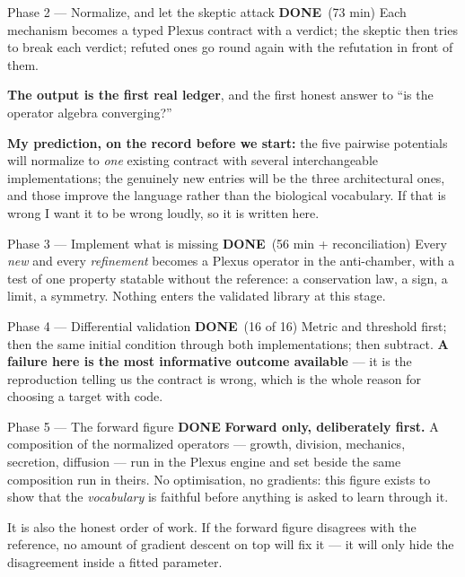 \documentclass[11pt,a4paper]{article}
\newcommand{\done}{\textcolor{good}{\textbf{DONE}}}
\begin{document}
\begin{phasebox}{Phase 2 --- Normalize, and let the skeptic attack \hfill \done\ (73 min)}
Each mechanism becomes a typed Plexus contract with a verdict; the skeptic then tries to break each
verdict; refuted ones go round again with the refutation in front of them.

\textbf{The output is the first real ledger}, and the first honest answer to ``is the operator
algebra converging?''

\textbf{My prediction, on the record before we start:} the five pairwise potentials will normalize
to \emph{one} existing contract with several interchangeable implementations; the genuinely new
entries will be the three architectural ones, and those improve the language rather than the
biological vocabulary. If that is wrong I want it to be wrong loudly, so it is written here.
\end{phasebox}

\begin{phasebox}{Phase 3 --- Implement what is missing \hfill \done\ (56 min + reconciliation)}
Every \emph{new} and every \emph{refinement} becomes a Plexus operator in the anti-chamber, with a
test of one property statable without the reference: a conservation law, a sign, a limit, a
symmetry. Nothing enters the validated library at this stage.
\end{phasebox}

\begin{phasebox}{Phase 4 --- Differential validation \hfill \done\ (16 of 16)}
Metric and threshold first; then the same initial condition through both implementations; then
subtract. \textbf{A failure here is the most informative outcome available} --- it is the
reproduction telling us the contract is wrong, which is the whole reason for choosing a target
with code.
\end{phasebox}

\begin{phasebox}{Phase 5 --- The forward figure \hfill \done}
\textbf{Forward only, deliberately first.} A composition of the normalized operators --- growth,
division, mechanics, secretion, diffusion --- run in the Plexus engine and set beside the same
composition run in theirs. No optimisation, no gradients: this figure exists to show that the
\emph{vocabulary} is faithful before anything is asked to learn through it.

It is also the honest order of work. If the forward figure disagrees with the reference, no amount
of gradient descent on top will fix it --- it will only hide the disagreement inside a fitted
parameter.
\end{phasebox}
\end{document}
